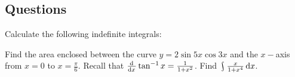 \documentclass{exam}
\theoremstyle{definition}
\theoremstyle{break}
\DeclareMathOperator*{\rint}{\scalerel*{\rotatebox{17}{$\!\int\!$}}{\int}}
\begin{document}
\subsection*{Questions}
\begin{questions}
  \question Calculate the following indefinite integrals:
  \question Find the area enclosed between the curve $ y = 2 \sin 5x \cos 3x $ and the $ x-$axis from $ x = 0 $ to $ x = \frac{\pi}{6} $.
  \question Recall that $ \od{}{x} \tan^{-1} x = \frac{1}{1 + x^2} $. Find $ \rint \frac{x}{1 + x^4} \dif{x} $.
\end{questions}
\end{document}
